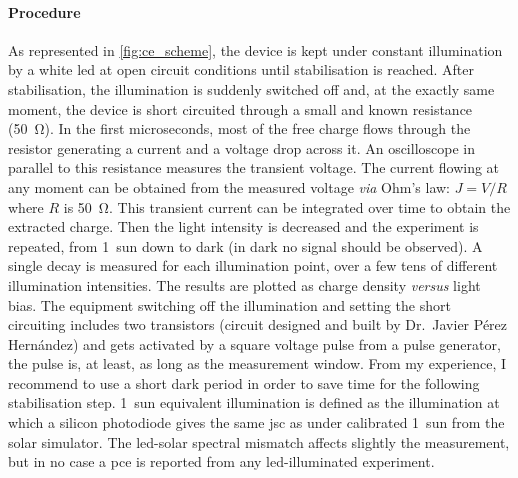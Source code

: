 	\paragraph{Procedure}
	As represented in \cref{fig:ce_scheme}, the device is kept under constant illumination by a white \gls{led} at open circuit conditions until stabilisation is reached.
	After stabilisation, the illumination is suddenly switched off and, at the exactly same moment, the device is short circuited through a small and known resistance (\SI{50}{\ohm}).
	In the first microseconds, most of the free charge flows through the resistor generating a current and a voltage drop across it.
	An oscilloscope in parallel to this resistance measures the transient voltage.
	The current flowing at any moment can be obtained from the measured voltage \textsl{via} Ohm's law: $J=V/R$ where $R$ is \SI{50}{\ohm}.
	This transient current can be integrated over time to obtain the extracted charge.
	Then the light intensity is decreased and the experiment is repeated, from 1~sun down to dark (in dark no signal should be observed).
	A single decay is measured for each illumination point, over a few tens of different illumination intensities.
	The results are plotted as charge density \textsl{versus} light bias.
	The equipment switching off the illumination and setting the short circuiting includes two transistors (circuit designed and built by Dr.\ Javier Pérez Hernández) and gets activated by a square voltage pulse from a pulse generator, the pulse is, at least, as long as the measurement window.
	From my experience, I recommend to use a short dark period in order to save time for the following stabilisation step.
	1~sun equivalent illumination is defined as the illumination at which a silicon photodiode gives the same \gls{jsc} as under calibrated 1~sun from the solar simulator.
	The \gls{led}-solar spectral mismatch affects slightly the measurement, but in no case a \gls{pce} is reported from any \gls{led}-illuminated experiment.

